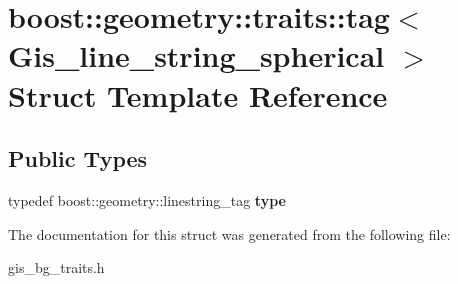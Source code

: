 \hypertarget{structboost_1_1geometry_1_1traits_1_1tag_3_01Gis__line__string__spherical_01_4}{}\section{boost\+:\+:geometry\+:\+:traits\+:\+:tag$<$ Gis\+\_\+line\+\_\+string\+\_\+spherical $>$ Struct Template Reference}
\label{structboost_1_1geometry_1_1traits_1_1tag_3_01Gis__line__string__spherical_01_4}
\subsection*{Public Types}
\begin{DoxyCompactItemize}
\item 
\mbox{\label{structboost_1_1geometry_1_1traits_1_1tag_3_01Gis__line__string__spherical_01_4_adebe54d0ee9153fee8863e15b2052327}} 
typedef boost\+::geometry\+::linestring\+\_\+tag {\bfseries type}
\end{DoxyCompactItemize}


The documentation for this struct was generated from the following file\+:\begin{DoxyCompactItemize}
\item 
gis\+\_\+bg\+\_\+traits.\+h\end{DoxyCompactItemize}
